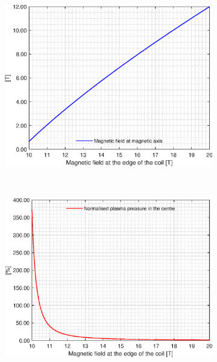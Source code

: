 \begin{figure}[H]
	\begin{subfigure}[b]{.45\textwidth}
		\includegraphics[width=\textwidth]{MatlabFigures/Bmax/f7.eps}
	\end{subfigure}
	~
	\begin{subfigure}[b]{.45\textwidth}
		\includegraphics[width=\textwidth]{MatlabFigures/Bmax/f8.eps}
	\end{subfigure}
\end{figure}
